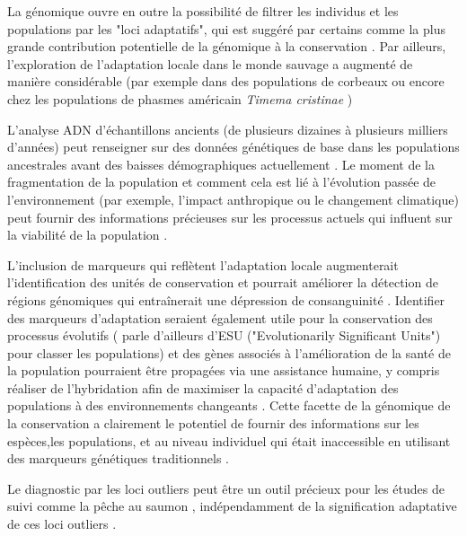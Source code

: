 \documentclass[a4paper,11pt,twoside]{report}
\begin{document}
La génomique ouvre en outre la possibilité de filtrer les individus et les populations par les "loci adaptatifs", qui est suggéré par certains comme la plus grande contribution potentielle de la génomique à la conservation \cite{mcmahon2014and}\cite{shafer2015genomics}. Par ailleurs, l'exploration de l'adaptation locale dans le monde sauvage a augmenté de manière considérable (par exemple dans des populations de corbeaux \cite{poelstra2014genomic} ou encore chez les populations de phasmes américain \textit{Timema cristinae} \cite{soria2014stick})

L'analyse ADN d'échantillons ancients (de plusieurs dizaines à plusieurs milliers d'années) peut renseigner sur des données génétiques de base dans les populations ancestrales avant des baisses démographiques actuellement \cite{bi2013unlocking}. Le moment de la fragmentation de la population et comment cela est lié à l'évolution passée de l'environnement (par exemple, l'impact anthropique ou le changement climatique) peut fournir des informations précieuses sur les processus actuels qui influent sur la viabilité de la population \cite{shafer2015genomics}.

L'inclusion de marqueurs qui reflètent l'adaptation locale augmenterait l'identification des unités de conservation et pourrait améliorer la détection de régions génomiques qui entraînerait une dépression de consanguinité \cite{allendorf2010genomics}\cite{funk2012harnessing}\cite{miller2014assessment}. Identifier des marqueurs d'adaptation seraient également utile pour la conservation des processus évolutifs (\citet{crandall2000considering} parle d'ailleurs d'ESU ("Evolutionarily Significant Units") pour classer les populations) et des gènes associés à l'amélioration de la santé de la population pourraient être propagées via une assistance humaine, y compris réaliser de l'hybridation afin de maximiser la capacité d'adaptation des populations à des environnements changeants \cite{barton2001role}\cite{nolte2010understanding}\cite{shafer2015genomics}. Cette facette de la génomique de la conservation a clairement le potentiel de fournir des informations sur les espèces,les populations, et au niveau individuel qui était inaccessible en utilisant des marqueurs génétiques traditionnels \cite{shafer2015genomics}.

Le diagnostic par les loci outliers peut être un outil précieux pour les études de suivi comme la pêche au saumon \cite{russello2012detection}, indépendamment de la signification adaptative de ces loci outliers \cite{shafer2015genomics}.
\end{document}
